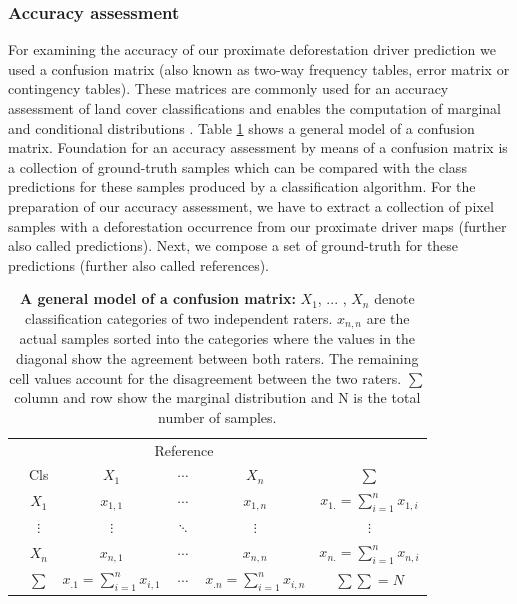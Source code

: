		\subsubsection{Accuracy assessment}
			For examining the accuracy of our proximate deforestation driver prediction we used a confusion matrix (also known as two-way frequency tables, error matrix or contingency tables). These matrices are commonly used for an accuracy assessment of land cover classifications and enables the computation of marginal and conditional distributions \citep{Congalton1991,Foody2002}. Table \ref{tab:confusion} shows a general model of a confusion matrix. Foundation for an accuracy assessment by means of a confusion matrix is a collection of ground-truth samples which can be compared with the class predictions for these samples produced by a classification algorithm. For the preparation of our accuracy assessment, we have to extract a collection of pixel samples with a deforestation occurrence from our proximate  driver maps (further also called predictions). Next, we compose a set of ground-truth for these predictions (further also called references).
			\begin{table}[ht]
				\centering
				\caption[A general model of a confusion matrix]{\textbf{A general model of a confusion matrix:} $X_1$, ... , $X_n$ denote classification categories of two independent raters. $x_{n,n}$ are the actual samples sorted into the categories where the values in the diagonal show the agreement between both raters. The remaining cell values account for the disagreement between the two raters. $\sum$ column and row show the marginal distribution and N is the total number of samples.}
				\label{tab:confusion}
				\begin{tabular}{lccccc}
					\hline
					& & \multicolumn{3}{c}{Reference} & \\
					& Cls & $X_1$ & $\cdots$ & $X_n$ & $\sum$ \\\hline
					\multirow{4}{*}{\STAB{\rotatebox[origin=c]{90}{Predict}}}
					& $X_1$ & $x_{1,1}$ & $\cdots$ & $x_{1,n}$ & $x_{1.}=
					\displaystyle\sum_{i=1}^{n} x_{1,i}$ \\ 
					& $\vdots$ & $\vdots$ & $\ddots$ & $\vdots$ & $\vdots$ \\ 
					& $X_n$ & $x_{n,1}$ & $\cdots$ & $x_{n,n}$ & $x_{n.}=\displaystyle\sum_{i=1}^{n}x_{n,i}$ \\\hline 
					& $\sum$ & $x_{.1}=\displaystyle\sum_{i=1}^{n}x_{i,1}$ & $\cdots$ & $x_{.n}=\displaystyle\sum_{i=1}^{n}x_{i,n}$ & $\sum\sum=N$ \\\hline
				\end{tabular}
			\end{table}

